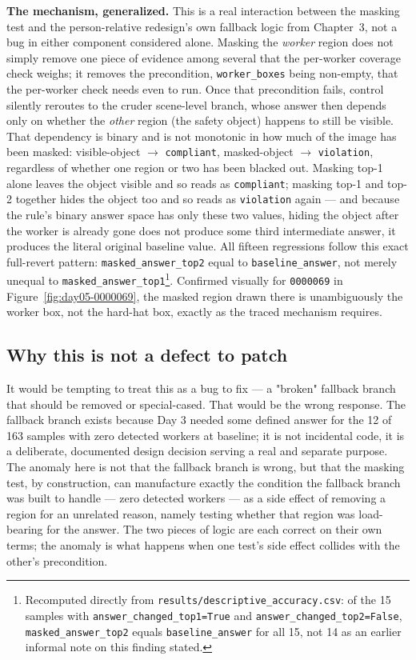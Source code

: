 \textbf{The mechanism, generalized.} This is a real interaction between the masking test and the
person-relative redesign's own fallback logic from Chapter~3, not a bug in either component
considered alone. Masking the \emph{worker} region does not simply remove one piece of evidence among
several that the per-worker coverage check weighs; it removes the precondition,
\texttt{worker\_boxes} being non-empty, that the per-worker check needs even to run. Once that
precondition fails, control silently reroutes to the cruder scene-level branch, whose answer then
depends only on whether the \emph{other} region (the safety object) happens to still be visible. That
dependency is binary and is not monotonic in how much of the image has been masked: visible-object
$\to$ \texttt{compliant}, masked-object $\to$ \texttt{violation}, regardless of whether one region or
two has been blacked out. Masking top-1 alone leaves the object visible and so reads as
\texttt{compliant}; masking top-1 and top-2 together hides the object too and so reads as
\texttt{violation} again --- and because the rule's binary answer space has only these two values,
hiding the object after the worker is already gone does not produce some third intermediate answer,
it produces the literal original baseline value. All fifteen regressions follow this exact
full-revert pattern: \texttt{masked\_answer\_top2} equal to \texttt{baseline\_answer}, not merely
unequal to \texttt{masked\_answer\_top1}\footnote{Recomputed directly from \texttt{results/descriptive\_accuracy.csv}: of the 15 samples with \texttt{answer\_changed\_top1=True} and \texttt{answer\_changed\_top2=False}, \texttt{masked\_answer\_top2} equals \texttt{baseline\_answer} for all 15, not 14 as an earlier informal note on this finding stated.}. Confirmed visually for \texttt{0000069} in
Figure~\ref{fig:day05-0000069}, the masked region drawn there is unambiguously the worker box, not the
hard-hat box, exactly as the traced mechanism requires.

\subsection{Why this is not a defect to patch}

It would be tempting to treat this as a bug to fix --- a "broken" fallback branch that should be
removed or special-cased. That would be the wrong response. The fallback branch exists because Day 3
needed some defined answer for the 12 of 163 samples with zero detected workers at baseline; it is not
incidental code, it is a deliberate, documented design decision serving a real and separate purpose.
The anomaly here is not that the fallback branch is wrong, but that the masking test, by construction,
can manufacture exactly the condition the fallback branch was built to handle --- zero detected
workers --- as a side effect of removing a region for an unrelated reason, namely testing whether that
region was load-bearing for the answer. The two pieces of logic are each correct on their own terms;
the anomaly is what happens when one test's side effect collides with the other's precondition.


